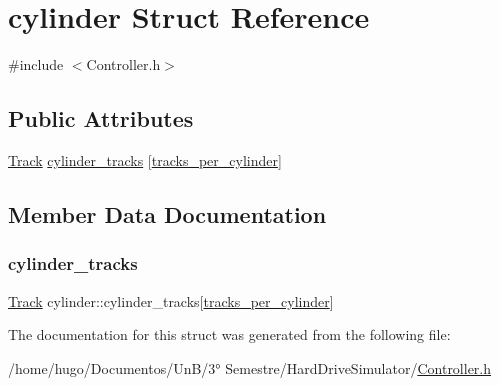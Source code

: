 \hypertarget{structcylinder}{}\section{cylinder Struct Reference}
\label{structcylinder}


{\ttfamily \#include $<$Controller.\+h$>$}

\subsection*{Public Attributes}
\begin{DoxyCompactItemize}
\item 
\hyperlink{Controller_8h_afc447719272e2c615253e5962c998916}{Track} \hyperlink{structcylinder_a95cba39fc914f1511069da5509f11674}{cylinder\+\_\+tracks} \mbox{[}\hyperlink{Controller_8h_ac2135ecb0c45d031ad75ea61d7a7ce64}{tracks\+\_\+per\+\_\+cylinder}\mbox{]}
\end{DoxyCompactItemize}


\subsection{Member Data Documentation}
\mbox{\label{structcylinder_a95cba39fc914f1511069da5509f11674}} 
\subsubsection{\texorpdfstring{cylinder\+\_\+tracks}{cylinder\_tracks}}
{\footnotesize\ttfamily \hyperlink{Controller_8h_afc447719272e2c615253e5962c998916}{Track} cylinder\+::cylinder\+\_\+tracks\mbox{[}\hyperlink{Controller_8h_ac2135ecb0c45d031ad75ea61d7a7ce64}{tracks\+\_\+per\+\_\+cylinder}\mbox{]}}



The documentation for this struct was generated from the following file\+:\begin{DoxyCompactItemize}
\item 
/home/hugo/\+Documentos/\+Un\+B/3° Semestre/\+Hard\+Drive\+Simulator/\hyperlink{Controller_8h}{Controller.\+h}\end{DoxyCompactItemize}
